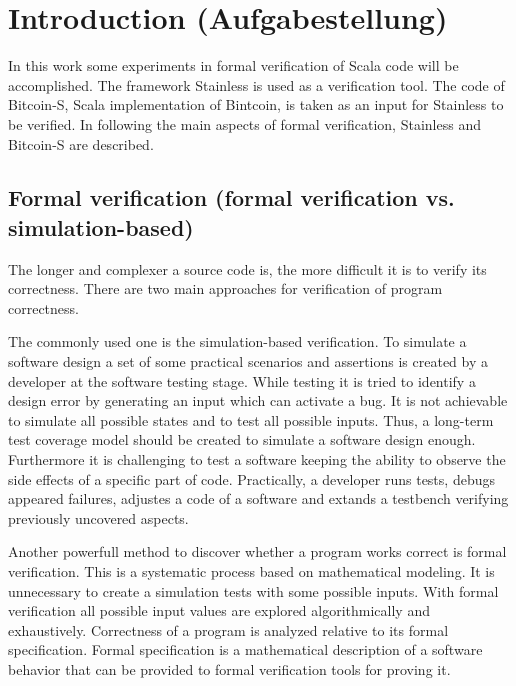 \chapter{Introduction (Aufgabestellung)}
\label{chap:introduction}

In this work some experiments in formal verification of Scala code will be accomplished. 
The framework Stainless is used as a verification tool. The code of Bitcoin-S, Scala implementation of Bintcoin, is taken as an input for Stainless to be verified. 
In following the main aspects of formal verification, Stainless and Bitcoin-S are described.

\nocite{kopka:band1}
\nocite{raichle:bibtex_programmierung}
\nocite{MiKTeX}
\nocite{KOMA}
\nocite{TeXnicCenter}
\nocite{Marti06}
\nocite{Erbsland08}
\nocite{juergens:einfuehrung}
\nocite{juergens:fortgeschritten}

\section{Formal verification (formal verification vs. simulation-based)}
\label{sec:formal_verification}

The longer and complexer a source code is, the more difficult it is to verify its correctness.
There are two main approaches for verification of program correctness. 

The commonly used one is the simulation-based verification.
To simulate a software design a set of some practical scenarios and assertions is created by a developer at the software testing stage. 
While testing it is tried to identify a design error by generating an input which can activate a bug.
It is not achievable to simulate all possible states and to test all possible inputs. 
Thus, a long-term test coverage model should be created to simulate a software design enough.
Furthermore it is challenging to test a software keeping the ability to observe the side effects of a specific part of code.
Practically, a developer runs tests, debugs appeared failures, adjustes a code of a software and extands a testbench verifying previously uncovered aspects. \cite{sanghavi:formal_verification}

Another powerfull method to discover whether a program works correct is formal verification. 
This is a systematic process based on mathematical modeling. 
It is unnecessary to create a simulation tests with some possible inputs. 
With formal verification all possible input values are explored algorithmically and exhaustively.
Correctness of a program is analyzed relative to its formal specification.
Formal specification is a mathematical description of a software behavior that can be provided to formal verification tools for proving it. \cite{sanghavi:formal_verification}


